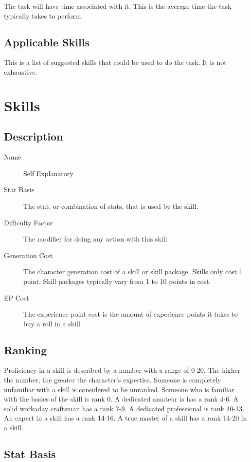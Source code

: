 The task will have time associated with it. This is the average time 
the task typically takes to perform. 

\subsection{Applicable Skills}

This is a list of suggested skills that could be used to do the task. 
It is not exhaustive.

\section{Skills}
\subsection{Description}

\begin{description}
	\item[Name] 
	Self Explanatory
	\item[Stat Basis] 
	The stat, or combination of stats, that is used by the skill. 
	\item[Difficulty Factor] 
	The modifier for doing any action with this skill.
	\item[Generation Cost]
	The character generation cost of a skill or skill package. Skills
	only cost 1 point. Skill packages typically vary from 1
	to 10 points in cost.
	\item[EP Cost] 
	The experience point cost is the amount of experience points it takes to
	buy a roll in a skill. 
\end{description}

\subsection{Ranking}

Proficiency in a skill is described by a number with a range of 0-20.
The higher the number, the greater the character's expertise. Someone
is completely unfamiliar with a skill is considered to be
{unranked}. Someone who is familiar with the basics of
the skill is rank 0. A dedicated amateur is has a rank 4-6. A
solid workaday craftsman has a rank 7-9. A dedicated professional is rank 
10-13. An expert in a skill has a rank 14-16. A true master of a skill has 
a rank 14-20 in a skill. 

\subsection{Stat Basis}

